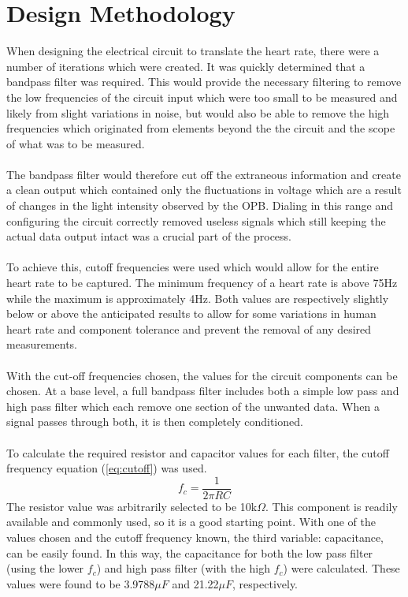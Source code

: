 \documentclass[conference]{IEEEtran}
\begin{document}
\section{Design Methodology}
    When designing the electrical circuit to translate the heart rate, 
    there were a number of iterations which were created. It was quickly
    determined that a bandpass filter was required. This would provide the
    necessary filtering to remove the low frequencies of the circuit input
    which were too small to be measured and likely from slight variations in
    noise, but would also be able to remove the high frequencies which 
    originated from elements beyond the the circuit and the scope of what was
    to be measured. \\ \\
    The bandpass filter would therefore cut off the extraneous information and
    create a clean output which contained only the fluctuations in voltage
    which are a result of changes in the light intensity observed by the OPB.
    Dialing in this range and configuring the circuit correctly removed
    useless signals which still keeping the actual data output intact was a
    crucial part of the process. \\ \\
    To achieve this, cutoff frequencies were used which would allow for the
    entire heart rate to be captured. The minimum frequency of a heart rate is
    above 75Hz while the maximum is approximately 4Hz. Both values are
    respectively slightly below or above the anticipated results to allow for
    some variations in human heart rate and component tolerance and prevent
    the removal of any desired measurements. \\ \\
    With the cut-off frequencies chosen, the values for the circuit components
    can be chosen. At a base level, a full bandpass filter includes both a
    simple low pass and high pass filter which each remove one section of the
    unwanted data. When a signal passes through both, it is then completely
    conditioned. \\ \\
    To calculate the required resistor and capacitor values for each filter,
    the cutoff frequency equation (\ref{eq:cutoff}) was used. \\
    \begin{equation}
        f_c = \frac{1}{2 \pi RC}
        \label{eq:cutoff}
    \end{equation}
    The resistor value was arbitrarily selected to be 10k$\Omega$. This
    component is readily available and commonly used, so it is a good
    starting point. With one of the values chosen and the cutoff frequency
    known, the third variable: capacitance, can be easily found. In this way,
    the capacitance for both the low pass filter (using the lower $f_c$) and
    high pass filter (with the high $f_c$) were calculated. These values were
    found to be 3.9788$\mu F$ and 21.22$\mu F$, respectively. \\ \\
    
\end{document}
